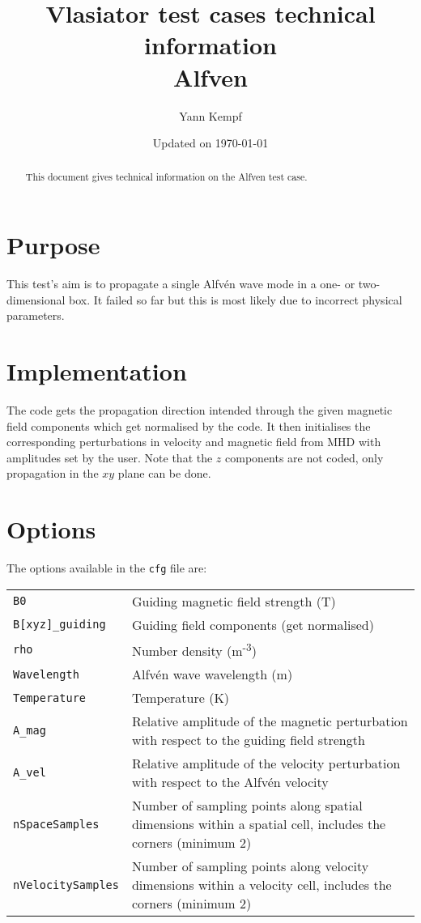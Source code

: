 \documentclass[a4paper,10pt]{scrartcl}
\title{
\Huge{Vlasiator test cases technical information} \\
\LARGE{Alfven}
}
\author{Yann Kempf}
\date{Updated on \today}
\begin{document}
\maketitle

\begin{abstract}
   This document gives technical information on the Alfven test case.
\end{abstract}

\section{Purpose}
This test's aim is to propagate a single Alfvén wave mode in a one- or two-dimensional box. It failed so far but this is most likely due to incorrect physical parameters.


\section{Implementation}
The code gets the propagation direction intended through the given magnetic field components which get normalised by the code. It then initialises the corresponding perturbations in velocity and magnetic field from MHD with amplitudes set by the user. Note that the $z$ components are not coded, only propagation in the $xy$ plane can be done.

\section{Options}
The options available in the \verb=cfg= file are:

\begin{tabularx}{\textwidth}{lX}
   \verb=B0= & Guiding magnetic field strength (T) \\
   \verb=B[xyz]_guiding= & Guiding field components (get normalised) \\
   \verb=rho= & Number density (m\textsuperscript{-3}) \\
   \verb=Wavelength= & Alfvén wave wavelength (m) \\
   \verb=Temperature= & Temperature (K) \\
   \verb=A_mag= & Relative amplitude of the magnetic perturbation with respect to the guiding field strength \\
   \verb=A_vel= & Relative amplitude of the velocity perturbation with respect to the Alfvén velocity \\
   \verb=nSpaceSamples= & Number of sampling points along spatial dimensions within a spatial cell, includes the corners (minimum 2) \\
   \verb=nVelocitySamples= & Number of sampling points along velocity dimensions within a velocity cell, includes the corners (minimum 2)
\end{tabularx}
\end{document}
